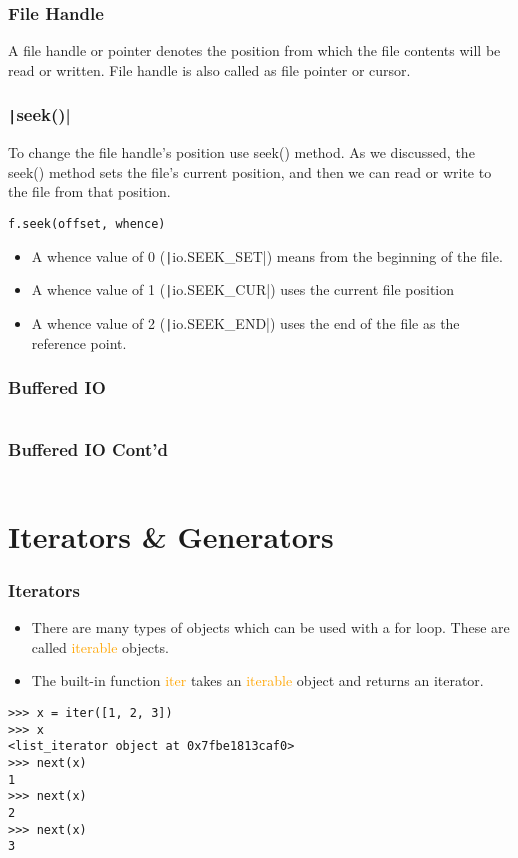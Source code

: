 \documentclass{../py-lecture}
\begin{document}
\begin{frame}
  \frametitle{File Handle}
  \begin{block}{}
    A file handle or pointer denotes the position from which the file contents will be read or written. File handle is also called as file pointer or cursor.
  \end{block}
\end{frame}

\begin{frame}[fragile]
  \frametitle{\texttt|seek()|}
  \begin{block}{}
    To change the file handle’s position use seek() method. As we discussed, the seek() method sets the file’s current position,
    and then we can read or write to the file from that position.
  \end{block}
  \begin{verbatim}
f.seek(offset, whence)
  \end{verbatim}
  \begin{itemize}
    \item A whence value of 0 (\texttt|io.SEEK_SET|) means from the beginning of the file.
    \item A whence value of 1 (\texttt|io.SEEK_CUR|) uses the current file position
    \item A whence value of 2 (\texttt|io.SEEK_END|) uses the end of the file as the reference point. 
  \end{itemize}
\end{frame}

\begin{frame}[fragile]
  \frametitle{Buffered IO}
  \inputminted[bgcolor=Black,fontsize=\scriptsize, lastline=13]{python}{./src/streams.py}
\end{frame}

\begin{frame}[fragile]
  \frametitle{Buffered IO Cont'd}
  \inputminted[bgcolor=Black,fontsize=\scriptsize, firstline=15]{python}{./src/streams.py}
\end{frame}

\section{Iterators \& Generators}

\begin{frame}[fragile]
	\frametitle{Iterators}
  \begin{itemize}
    \item There are many types of objects which can be used with a for loop.
    These are called \textcolor{Orange}{iterable} objects.
    \item The built-in function \textcolor{Orange}{iter} takes an \textcolor{Orange}{iterable}
    object and returns an iterator.
  \end{itemize}
  \begin{verbatim}
>>> x = iter([1, 2, 3])
>>> x
<list_iterator object at 0x7fbe1813caf0>
>>> next(x)
1
>>> next(x)
2
>>> next(x)
3
  \end{verbatim}
\end{frame}
\end{document}
